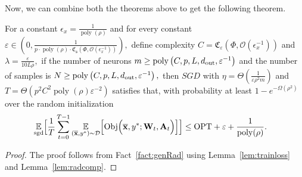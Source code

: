 Now, we can combine both the theorems above to get the following theorem.
\begin{theorem}\label{thm:main_theorem}
   For a constant $\epsilon_x = \frac{1}{\operatorname{poly}(\rho)}$ and for every constant $\varepsilon \in \left(0, \frac{1}{p \cdot \operatorname{poly}(\rho) \cdot \mathfrak{C}_{\mathfrak{s}}(\Phi, \mathcal{O}(\epsilon_x^{-1}))}\right),$ define complexity $C=\mathfrak{C}_{\varepsilon}(\Phi, \mathcal{O}(\epsilon_x^{-1}))$
and $\lambda=\frac{\varepsilon}{10 L \rho},$ if the number of neurons $m \geq \operatorname{poly}\left(C, p, L, d_{\mathrm{out}} , \varepsilon^{-1}\right)$ and the number of samples is $N \geq \operatorname{poly}\left(C, p, L, d_{\mathrm{out}} , \varepsilon^{-1}\right),$ then $S G D$ with $\eta=\Theta\left(\frac{1}{\varepsilon \rho^{2} m}\right)$ and $T=\Theta(p^{2} C^{2} \operatorname{poly}(\rho)\varepsilon^{-2})$
satisfies that, with probability at least $1-e^{-\Omega\left(\rho^{2}\right)}$ over the random initialization
\begin{align*} 
\underset{\mathrm { sgd }}{\mathbb{E}}\Big[\frac{1}{T} &\sum_{t=0}^{T-1} \underset{\left(\overline{\mathbf{x}}, y^{\ast}\right) \sim \mathcal{D}}{\mathbb{E}}\Big[ \mathrm{Obj}\Big(\overline{\mathbf{x}}, y^{\ast};  \mathbf{W}_{t},  \mathbf{A}_t\Big)\Big]\Big] \leq \mathrm{OPT}+\varepsilon+\frac{1}{\operatorname{poly}(\rho)}.
\end{align*}
\end{theorem}

\begin{proof}
    The proof follows from Fact~\ref{fact:genRad} using Lemma~\ref{lem:trainloss} and Lemma~\ref{lem:radcomp}.
\end{proof}